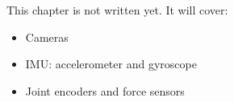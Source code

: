 \label{ch:hw3}
\begin{keyidea}
This chapter is not written yet. It will cover:
\begin{itemize}[nosep]
  \item Cameras
  \item IMU: accelerometer and gyroscope
  \item Joint encoders and force sensors
\end{itemize}
\end{keyidea}
